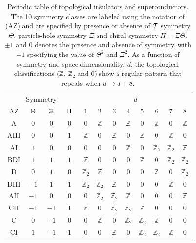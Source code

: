 \documentclass[twocolumn,floatfix,showpacs,rmp,aps]{revtex4}
\begin{document}
\begin{table}
  \centering
\begin{ruledtabular}
\begin{tabular}{c|ccc|cccccccc}
\multicolumn{4}{c|}{Symmetry } & \multicolumn{8}{c}{ $d$} \\
\multicolumn{1}{c}{AZ} &$\hspace{1.5mm}\Theta\hspace{1.5mm} $ &
                        $\hspace{1.5mm} \Xi\hspace{1.5mm} $ &
                        $\hspace{1.5mm} \Pi\hspace{1.5mm} $ &
 $1$   &  $2$ &  $3$ &  $4$ &  $5$ & $6$ & $7$& $8$ \\
 \hline
A & $0$ & $0$ & $0$  &$0$& $\mathbb{Z}$ &$0$& $\mathbb{Z}$ &$0$& $\mathbb{Z}$ &$0$& $\mathbb{Z}$\\
AIII & $0$ & $0$ & $1$ & $\mathbb{Z}$ &$0$& $\mathbb{Z}$ &$0$& $\mathbb{Z}$ &$0$& $\mathbb{Z}$& $0$\\
\hline
 AI & $1$ & $0$ & $0$  &$0$&$0$&$0$&$\mathbb{Z}$&$0$&$\mathbb{Z}_2$&$\mathbb{Z}_2$& $\mathbb{Z}$ \\
 BDI & $1$ &$1$ &$1$ & $\mathbb{Z}$ &$0$&$0$&$0$&$\mathbb{Z}$&$0$&$\mathbb{Z}_2$& $\mathbb{Z}_2$\\
 D & $0$ &$1$ &$0$ & $\mathbb{Z}_2$& $\mathbb{Z}$ &$0$&$0$&$0$&$\mathbb{Z}$&$0$&$\mathbb{Z}_2$\\
 DIII&$-1$ &$1$ &$1$ &$\mathbb{Z}_2$& $\mathbb{Z}_2$& $\mathbb{Z}$ &$0$&$0$&$0$&$\mathbb{Z}$&$0$\\
 AII & $-1$ & $0$ & $0$ &$0$&$\mathbb{Z}_2$& $\mathbb{Z}_2$& $\mathbb{Z}$ &$0$&$0$& $0$&$\mathbb{Z}$\\
 CII & $-1$ &$-1$ & $1$&$\mathbb{Z}$ & $0$&$\mathbb{Z}_2$& $\mathbb{Z}_2$& $\mathbb{Z}$ &$0$&$0$&$0$ \\
 C & $0$ & $-1$& $0$ & $0$ &$\mathbb{Z}$ &$0$&$\mathbb{Z}_2$& $\mathbb{Z}_2$& $\mathbb{Z}$ &$0$& $0$\\
 CI & $1$ & $-1$ & $1$& $0$ & $0$&$\mathbb{Z}$&$0$&$\mathbb{Z}_2$& $\mathbb{Z}_2$& $\mathbb{Z}$& $0$ \\

\end{tabular}
\end{ruledtabular}
\caption{Periodic table of topological insulators and superconductors.  The 10 symmetry
classes are labeled using the notation of \textcite{altland97} (AZ) and are
specified by presence or absence of ${\cal T}$ symmetry
$\Theta$, particle-hole symmetry $\Xi$ and chiral symmetry $\Pi = \Xi\Theta$.
$\pm 1$ and $0$ denotes the presence and absence of symmetry,
with $\pm 1$ specifying the value of $\Theta^2$ and
$\Xi^2$.  As a function of symmetry and space dimensionality, $d$, the topological
classifications ($\mathbb{Z}$, $\mathbb{Z}_2$ and $0$) show a regular pattern
that repeats when $d \rightarrow d+8$.  }
\label{tab:periodic}
\end{table}
\end{document}

